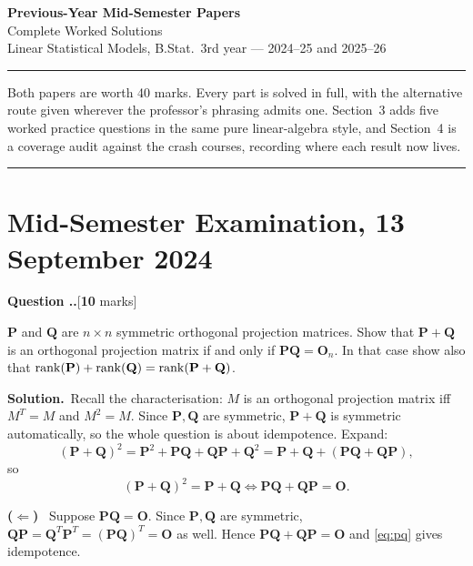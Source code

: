 \documentclass[11pt]{article}
\newcounter{qq}[section]
\newcommand{\qhead}[2]{\medskip\refstepcounter{qq}%
  \noindent\textbf{\color{Blue}Question \thesection.\theqq.}\hfill\textnormal{[\textbf{#1} marks]}%
  \ifx\relax#2\relax\else\par\smallskip\fi}
\newcommand{\sol}{\smallskip\noindent\textbf{\color{ForestGreen}Solution.}\ }
\newcommand{\pt}[1]{\smallskip\noindent\textbf{(#1)}\ }
\begin{document}
\begin{center}
{\LARGE\bfseries Previous-Year Mid-Semester Papers}\\[4pt]
{\large Complete Worked Solutions}\\[3pt]
{\small Linear Statistical Models, B.Stat.\ 3rd year --- 2024--25 and 2025--26}
\end{center}
\vspace{2pt}\hrule\vspace{10pt}

\noindent Both papers are worth 40 marks. Every part is solved in full, with the
alternative route given wherever the professor's phrasing admits one. Section~3 adds five
worked practice questions in the same pure linear-algebra style, and Section~4 is a coverage
audit against the crash courses, recording where each result now lives.

\tableofcontents
\vspace{6pt}\hrule\vspace{8pt}

\section{Mid-Semester Examination, 13 September 2024}

\qhead{10}{}
\begin{stmt}
$\mathbf{P}$ and $\mathbf{Q}$ are $n\times n$ symmetric orthogonal projection matrices.
Show that $\mathbf{P}+\mathbf{Q}$ is an orthogonal projection matrix if and only if
$\mathbf{PQ}=\mathbf{O}_n$. In that case show also that
$\operatorname{rank}(\mathbf{P})+\operatorname{rank}(\mathbf{Q})=\operatorname{rank}(\mathbf{P}+\mathbf{Q})$.
\end{stmt}

\sol Recall the characterisation: $M$ is an orthogonal projection matrix iff $M^T=M$ and
$M^2=M$. Since $\mathbf{P},\mathbf{Q}$ are symmetric, $\mathbf{P}+\mathbf{Q}$ is symmetric
automatically, so the whole question is about idempotence. Expand:
\[
  (\mathbf{P}+\mathbf{Q})^2=\mathbf{P}^2+\mathbf{PQ}+\mathbf{QP}+\mathbf{Q}^2
  =\mathbf{P}+\mathbf{Q}+(\mathbf{PQ}+\mathbf{QP}),
\]
so
\begin{equation}\label{eq:pq}
  (\mathbf{P}+\mathbf{Q})^2=\mathbf{P}+\mathbf{Q}
  \iff \mathbf{PQ}+\mathbf{QP}=\mathbf{O}.
\end{equation}

\pt{$\Leftarrow$} Suppose $\mathbf{PQ}=\mathbf{O}$. Since $\mathbf{P},\mathbf{Q}$ are
symmetric, $\mathbf{QP}=\mathbf{Q}^T\mathbf{P}^T=(\mathbf{PQ})^T=\mathbf{O}$ as well.
Hence $\mathbf{PQ}+\mathbf{QP}=\mathbf{O}$ and \eqref{eq:pq} gives idempotence.
\end{document}
